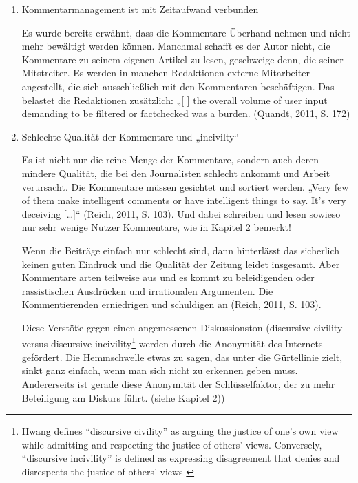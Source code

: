 \begin{enumerate}
\item Kommentarmanagement ist mit Zeitaufwand verbunden

Es wurde bereits erwähnt, dass die Kommentare
Überhand nehmen und nicht mehr bewältigt werden können. Manchmal schafft es der
Autor nicht, die Kommentare zu seinem eigenen Artikel zu lesen, geschweige denn,
die seiner Mitstreiter. Es werden in manchen Redaktionen externe Mitarbeiter
angestellt, die sich ausschließlich mit den Kommentaren beschäftigen. Das
belastet die Redaktionen zusätzlich: „[ ] the overall volume of user input
demanding to be filtered or factchecked was a burden. (Quandt, 2011, S. 172)


\item Schlechte Qualität der Kommentare und „incivilty“

Es ist nicht nur die reine Menge der Kommentare, sondern auch deren mindere
Qualität, die bei den Journalisten schlecht ankommt und Arbeit verursacht. Die
Kommentare müssen gesichtet und sortiert werden. „Very few of them make
intelligent comments or have intelligent things to say. It's very deceiving
[\ldots]“ (Reich, 2011, S. 103).  Und dabei schreiben und lesen sowieso nur sehr
wenige Nutzer Kommentare, wie in Kapitel 2 bemerkt!




Wenn die Beiträge einfach nur schlecht sind, dann hinterlässt das sicherlich
keinen guten Eindruck und die Qualität der Zeitung leidet insgesamt. Aber
Kommentare arten teilweise aus und es kommt zu beleidigenden oder rassistischen
Ausdrücken und irrationalen Argumenten. Die Kommentierenden erniedrigen und
schuldigen an (Reich, 2011, S. 103).

Diese Verstöße gegen einen angemessenen Diskussionston (\glqq discursive
civility\grqq{} versus \glqq discursive incivility\grqq\footnote{Hwang defines
  ``discursive civility'' as arguing the justice of one's own view while
  admitting and respecting the justice of others' views. Conversely,
  ``discursive incivility'' is defined as expressing disagreement that denies
and disrespects the justice of others'  views \autocite{hwang}
\autocite[S.~6/7]{santana:2014}} werden durch die Anonymität des Internets
gefördert. Die Hemmschwelle etwas zu sagen, das unter die Gürtellinie zielt,
sinkt ganz einfach, wenn man sich nicht zu erkennen geben muss. Andererseits ist
gerade diese Anonymität der Schlüsselfaktor, der zu mehr Beteiligung am Diskurs
führt. (siehe Kapitel 2))


\end{enumerate}
